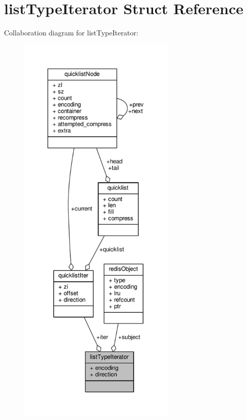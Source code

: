 \hypertarget{structlistTypeIterator}{}\section{list\+Type\+Iterator Struct Reference}
\label{structlistTypeIterator}


Collaboration diagram for list\+Type\+Iterator\+:\nopagebreak
\begin{figure}[H]
\begin{center}
\leavevmode
\includegraphics[height=550pt]{structlistTypeIterator__coll__graph}
\end{center}
\end{figure}
